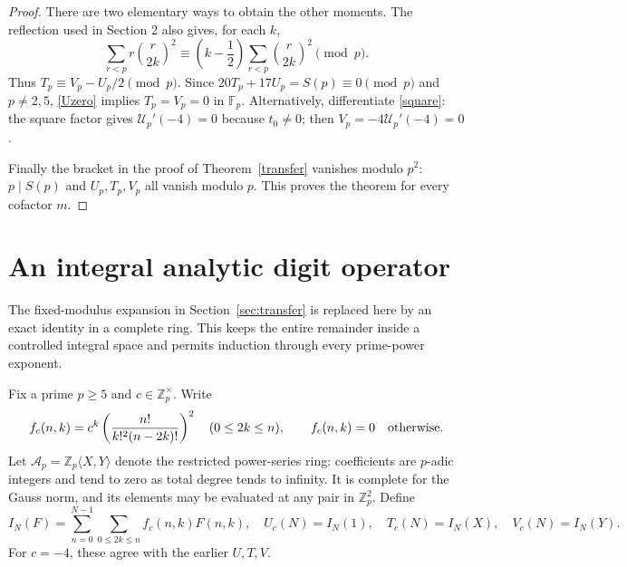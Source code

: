 \documentclass[11pt,a4paper]{article}
\theoremstyle{remark}\newtheorem{remark}[theorem]{Remark}
\newcommand{\Z}{\mathbb Z}
\newcommand{\F}{\mathbb F}
\begin{document}
\begin{proof}
There are two elementary ways to obtain the other moments.
The reflection used in Section 2 also gives, for each \(k\),
\[
 \sum_{r<p}r\binom r{2k}^2
 \equiv\left(k-\frac12\right)\sum_{r<p}\binom r{2k}^2\pmod p.
\]
Thus \(T_p\equiv V_p-U_p/2\pmod p\).
Since \(20T_p+17U_p=S(p)\equiv0\pmod p\) and \(p\ne2,5\),
\eqref{Uzero} implies \(T_p=V_p=0\) in \(\F_p\).
Alternatively, differentiate \eqref{square}: the square factor gives
\(\mathcal U_p'(-4)=0\) because \(t_0\ne0\); then
\(V_p=-4\mathcal U_p'(-4)=0\).

Finally the bracket in the proof of Theorem~\ref{transfer} vanishes
modulo \(p^2\): \(p\mid S(p)\) and \(U_p,T_p,V_p\) all vanish modulo \(p\).
This proves the theorem for every cofactor \(m\).
\end{proof}

\section{An integral analytic digit operator}\label{sec:analytic}

The fixed-modulus expansion in Section~\ref{sec:transfer} is replaced here
by an exact identity in a complete ring. This keeps the entire remainder
inside a controlled integral space and permits induction through every
prime-power exponent.

Fix a prime \(p\ge5\) and \(c\in\Z_p^\times\). Write
\[
 f_c(n,k)=c^k\left(\frac{n!}{k!^2(n-2k)!}\right)^2
 \quad(0\le2k\le n),\qquad f_c(n,k)=0\quad\hbox{otherwise}.
\]
Let \(\mathcal A_p=\Z_p\langle X,Y\rangle\) denote the restricted
power-series ring: coefficients are \(p\)-adic integers and tend to zero
as total degree tends to infinity. It is complete for the Gauss norm,
and its elements may be evaluated at any pair in \(\Z_p^2\). Define
\[
 I_N(F)=\sum_{n=0}^{N-1}\sum_{0\le2k\le n}f_c(n,k)F(n,k),
 \quad U_c(N)=I_N(1),\quad T_c(N)=I_N(X),\quad V_c(N)=I_N(Y).
\]
For \(c=-4\), these agree with the earlier \(U,T,V\).
\end{document}
